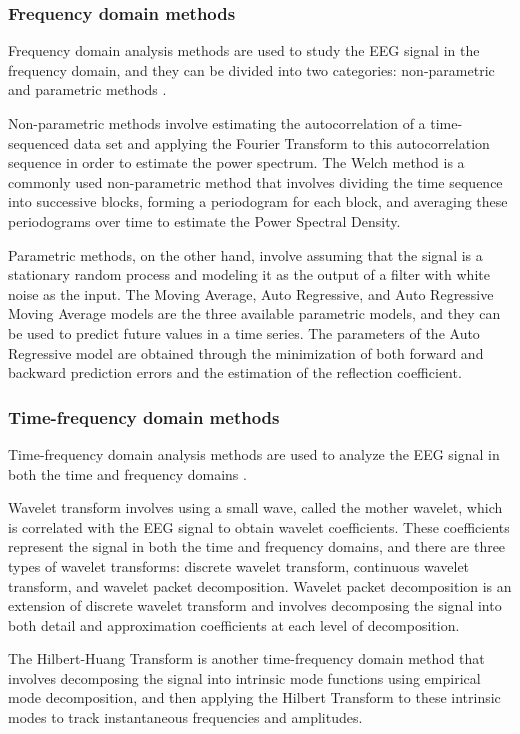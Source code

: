\subsubsection{Frequency domain methods}
Frequency domain analysis methods are used to study the \gls{EEG} signal in the frequency domain, and they can be divided into two categories: non-parametric and parametric methods \cite{acharya_automated_2013}.

Non-parametric methods involve estimating the autocorrelation of a time-sequenced data set and applying the Fourier Transform to this autocorrelation sequence in order to estimate the power spectrum. 
The Welch method is a commonly used non-parametric method that involves dividing the time sequence into successive blocks, forming a periodogram for each block, and averaging these periodograms over time to estimate the Power Spectral Density. 

Parametric methods, on the other hand, involve assuming that the signal is a stationary random process and modeling it as the output of a filter with white noise as the input. 
The Moving Average, Auto Regressive, and Auto Regressive Moving Average models are the three available parametric models, and they can be used to predict future values in a time series. The parameters of the Auto Regressive model are obtained through the minimization of both forward and backward prediction errors and the estimation of the reflection coefficient.

\subsubsection{Time-frequency domain methods}
Time-frequency domain analysis methods are used to analyze the \gls{EEG} signal in both the time and frequency domains \cite{acharya_automated_2013}.

Wavelet transform involves using a small wave, called the mother wavelet, which is correlated with the \gls{EEG} signal to obtain wavelet coefficients. These coefficients represent the signal in both the time and frequency domains, and there are three types of wavelet transforms: discrete wavelet transform, continuous wavelet transform, and wavelet packet decomposition. 
Wavelet packet decomposition is an extension of discrete wavelet transform and involves decomposing the signal into both detail and approximation coefficients at each level of decomposition. 

The Hilbert-Huang Transform is another time-frequency domain method that involves decomposing the signal into intrinsic mode functions using empirical mode decomposition, and then applying the Hilbert Transform to these intrinsic modes to track instantaneous frequencies and amplitudes.

